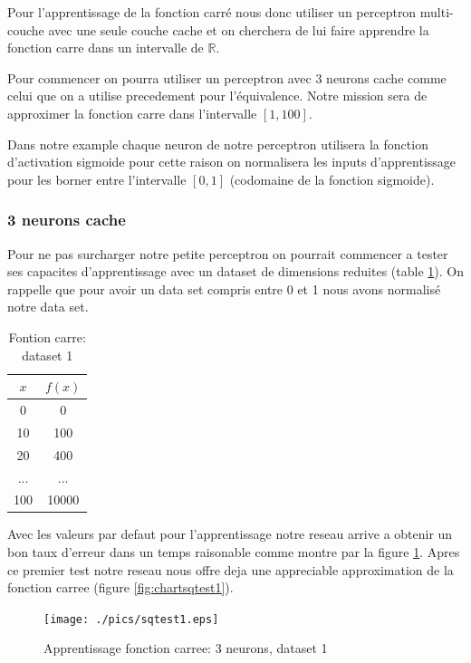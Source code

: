 \documentclass[twoside,openright,a4paper,11pt,french]{article}
\begin{document}
Pour l'apprentissage de la fonction carré nous donc utiliser un perceptron
multi-couche avec une seule couche cache et on cherchera de lui faire apprendre
la fonction carre dans un intervalle de $\mathbb{R}$.

Pour commencer on pourra utiliser un perceptron avec 3 neurons cache comme
celui que on a utilise precedement pour l'équivalence. Notre mission sera de
approximer la fonction carre dans l'intervalle $[1,100]$.

Dans notre example chaque neuron de notre perceptron utilisera la fonction
d'activation sigmoide pour cette raison on normalisera les inputs
d'apprentissage pour les borner entre l'intervalle $[0,1]$ (codomaine de la
fonction sigmoide).

\subsubsection{3 neurons cache}

Pour ne pas surcharger notre petite perceptron on pourrait commencer a tester
ses capacites d'apprentissage avec un dataset de dimensions reduites (table
\ref{tab:fqt1}). On rappelle que pour avoir un data set compris entre 0 et 1
nous avons normalisé notre data set.

\begin{table}[ht]
  \centering
  \begin{tabular}{| c | c |}
    \hline
    \textbf{$x$} & \textbf{$f(x)$}\\
    \hline
    0 & 0 \\
    \hline
    10 & 100 \\
    \hline
    20 & 400 \\
    \hline
    ... & ... \\
    \hline
    100 & 10000 \\
    \hline
  \end{tabular}
  \caption{Fontion carre: dataset 1}
  \label{tab:fqt1}
\end{table}

Avec les valeurs par defaut pour l'apprentissage notre reseau arrive a obtenir
un bon taux d'erreur dans un temps raisonable comme montre par la figure
\ref{fig:sqtest1}. Apres ce premier test notre reseau nous offre deja une
appreciable approximation de la fonction carree (figure \ref{fig:chartsqtest1}).

\begin{figure}[ht]
\centering
\texttt{[image: ./pics/sqtest1.eps]}
\caption{Apprentissage fonction carree: 3 neurons, dataset 1}
\label{fig:sqtest1}
\end{figure}
\end{document}
